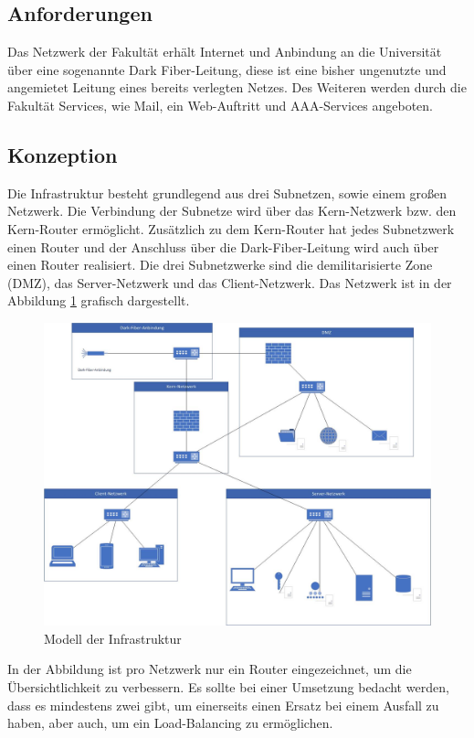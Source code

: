 \documentclass[a4paper]{article}
\begin{document}
\subsection{Anforderungen}
Das Netzwerk der Fakultät erhält Internet und Anbindung an die Universität über eine sogenannte Dark Fiber-Leitung, diese ist eine bisher ungenutzte und angemietet Leitung eines bereits verlegten Netzes. Des Weiteren werden durch die Fakultät Services, wie Mail, ein Web-Auftritt und AAA-Services angeboten.

\subsection{Konzeption}
Die Infrastruktur besteht grundlegend aus drei Subnetzen, sowie einem großen Netzwerk. Die Verbindung der Subnetze wird über das Kern-Netzwerk bzw. den Kern-Router ermöglicht. Zusätzlich zu dem Kern-Router hat jedes Subnetzwerk einen Router und der Anschluss über die Dark-Fiber-Leitung wird auch über einen Router realisiert. Die drei Subnetzwerke sind die demilitarisierte Zone (DMZ), das Server-Netzwerk und das Client-Netzwerk. Das Netzwerk ist in der Abbildung \ref{fig:model} grafisch dargestellt.

\begin{figure}[H]
  \includegraphics[width=\linewidth]{pictures/netzwerk-diagramm.jpg}
  \caption{Modell der Infrastruktur}
  \label{fig:model}
\end{figure}

In der Abbildung ist pro Netzwerk nur ein Router eingezeichnet, um die Übersichtlichkeit zu verbessern. Es sollte bei einer Umsetzung bedacht werden, dass es mindestens zwei gibt, um einerseits einen Ersatz bei einem Ausfall zu haben, aber auch, um  ein Load-Balancing zu ermöglichen.
\end{document}
